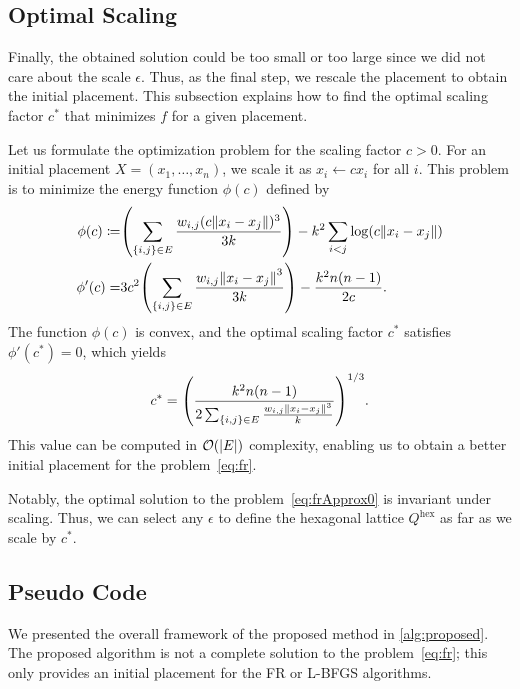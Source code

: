 \documentclass[dvipdfmx,10pt,journal,compsoc]{IEEEtran}
\newcommand{\defeq}{\coloneqq}
\begin{document}
\subsection{Optimal Scaling}\label{ssec:optimalScaling}

Finally, the obtained solution could be too small or too large since we did not care about the scale $\epsilon$.
Thus, as the final step, we rescale the placement to obtain the initial placement.
This subsection explains how to find the optimal scaling factor $c^*$ that minimizes $f$ for a given placement.

Let us formulate the optimization problem for the scaling factor $c > 0$.
For an initial placement $X = (x_1, \dots, x_n)$, we scale it as $x_i \gets c x_i$ for all $i$.
This problem is to minimize the energy function $\phi(c)$ defined by
\begin{align*}
  \phi(c) \defeq & \qty(\sum_{\{i,j\} \in E} \frac{w_{i,j} (c \norm{x_i - x_j})^3}{3k}) - k^2 \sum_{i < j} \log(c \norm{x_i - x_j}) \\
  \phi'(c) =     & 3c^2 \qty(\sum_{\{i,j\} \in E} \frac{w_{i,j} \norm{x_i - x_j}^3}{3k}) - \frac{k^2 n(n-1)}{2c}.
\end{align*}
The function $\phi(c)$ is convex, and the optimal scaling factor $c^*$ satisfies $\phi'(c^*) = 0$, which yields
\begin{equation}\label{eq:scaling}
  c^* = \qty(\frac{k^2 n(n-1)}{2 \sum_{\{i,j\} \in E} \frac{w_{i,j} \norm{x_i - x_j}^3}{k}})^{1/3}.
\end{equation}
This value can be computed in $\order{\abs{E}}$ complexity, enabling us to obtain a better initial placement for the problem~\eqref{eq:fr}.

Notably, the optimal solution to the problem~\eqref{eq:frApprox0} is invariant under scaling. Thus, we can select any $\epsilon$ to define the hexagonal lattice $Q^\mathrm{hex}$ as far as we scale by $c^*$.

\subsection{Pseudo Code}\label{ssec:pseudoCode}

We presented the overall framework of the proposed method in \cref{alg:proposed}.
The proposed algorithm is not a complete solution to the problem~\eqref{eq:fr}; this only provides an initial placement for the FR or L-BFGS algorithms.
\end{document}
